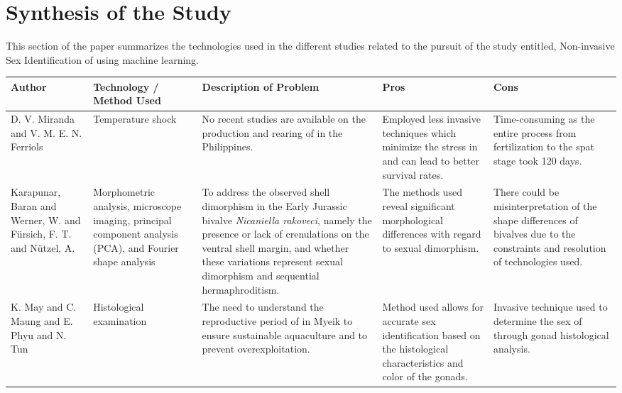 \section{Synthesis of the Study}
This section of the paper summarizes the technologies used in the different studies related to the pursuit of the study entitled, Non-invasive Sex Identification of \Tgranosa using machine learning.

\begin{table}[]
	\centering
	\renewcommand{\arraystretch}{3} 
	\begin{adjustbox}{scale=0.55,center}
	\normalsize
	\begin{tabular}{|p{5cm}|p{5cm}|p{8cm}|p{8cm}|p{8cm}|}
		\hline
		\centering
		\textbf{Author} &
		\centering
		\textbf{Technology / Method Used} &
		\centering
		\textbf{Description of Problem} &
		\centering
		\textbf{Pros} &
		\textbf{Cons} \\ \hline
		
		D. V. Miranda and V. M. E. N. Ferriols &
		Temperature shock &
		No recent studies are available on the production and rearing of \textit{\Tgranosa} in the Philippines. &
		Employed less invasive techniques which minimize the stress in \textit{\Tgranosa} and can lead to better survival rates. &
		Time-consuming as the entire process from fertilization to the spat stage took 120 days. \\ \hline
		
		Karapunar, Baran and Werner, W. and Fürsich, F. T. and Nützel, A. &
		Morphometric analysis, microscope imaging, principal component analysis (PCA), and Fourier shape analysis &
		To address the observed shell dimorphism in the Early Jurassic bivalve \textit{Nicaniella rakoveci}, namely the presence or lack of crenulations on the ventral shell margin, and whether these variations represent sexual dimorphism and sequential hermaphroditism. &
		The methods used reveal significant morphological differences with regard to sexual dimorphism. &
		There could be misinterpretation of the shape differences of bivalves due to the constraints and resolution of technologies used. \\ \hline
		
		K. May and C. Maung and E. Phyu and N. Tun &
		Histological examination &
		The need to understand the reproductive period of \textit{\Tgranosa} in Myeik to ensure sustainable aquaculture and to prevent overexploitation. &
		Method used allows for accurate sex identification based on the histological characteristics and color of the gonads. &
		Invasive technique used to determine the sex of \textit{\Tgranosa} through gonad histological analysis. \\ \hline
		

\end{tabular}
\end{adjustbox}
\end{table}
